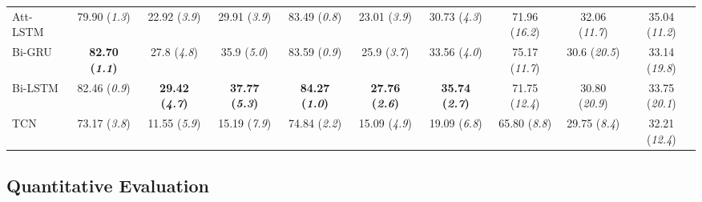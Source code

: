 \documentclass[letterpaper, 10 pt, conference]{ieeeconf}
\begin{document}
\begin{table*}[]
{\begin{tabular}{|l|ccc|ccc|ccc|}
Att-LSTM
& 79.90 (\textit{\scriptsize\scriptsize 1.3})
& 22.92 (\textit{\scriptsize\scriptsize 3.9}) 
& 29.91 (\textit{\scriptsize\scriptsize 3.9})
& 83.49 (\textit{\scriptsize\scriptsize 0.8}) 
& 23.01 (\textit{\scriptsize\scriptsize 3.9}) 
& 30.73 (\textit{\scriptsize\scriptsize 4.3})
& 71.96 (\textit{\scriptsize\scriptsize 16.2}) 
& 32.06 (\textit{\scriptsize\scriptsize 11.7}) 
& 35.04 (\textit{\scriptsize\scriptsize 11.2}) \\

Bi-GRU
& \textbf{82.70 (\textit{\scriptsize\scriptsize 1.1})}
& 27.8 (\textit{\scriptsize\scriptsize 4.8})
& 35.9 (\textit{\scriptsize\scriptsize 5.0})
& 83.59 (\textit{\scriptsize\scriptsize 0.9}) 
& 25.9 (\textit{\scriptsize\scriptsize 3.7}) 
& 33.56 (\textit{\scriptsize\scriptsize 4.0})
& 75.17 (\textit{\scriptsize\scriptsize 11.7}) 
& 30.6 (\textit{\scriptsize\scriptsize 20.5}) 
& 33.14 (\textit{\scriptsize\scriptsize 19.8})
 \\

Bi-LSTM \cite{Zou2019DeepBiLSTMRecognition}
& 82.46 (\textit{\scriptsize\scriptsize 0.9}) 
& \textbf{29.42 (\textit{\scriptsize\scriptsize 4.7})} 
& \textbf{37.77 (\textit{\scriptsize\scriptsize 5.3})}
& \textbf{84.27 (\textit{\scriptsize\scriptsize 1.0})} 
& \textbf{27.76 (\textit{\scriptsize\scriptsize 2.6})} 
& \textbf{35.74 (\textit{\scriptsize\scriptsize 2.7})}
& 71.75 (\textit{\scriptsize\scriptsize 12.4})
& 30.80 (\textit{\scriptsize\scriptsize 20.9}) 
& 33.75 (\textit{\scriptsize\scriptsize 20.1}) \\


TCN \cite {Lea2017TemporalDetection}
& 73.17 (\textit{\scriptsize\scriptsize 3.8}) 
& 11.55 (\textit{\scriptsize\scriptsize 5.9})
& 15.19 (\textit{\scriptsize\scriptsize 7.9})
& 74.84 (\textit{\scriptsize\scriptsize 2.2}) 
& 15.09 (\textit{\scriptsize\scriptsize 4.9}) 
& 19.09 (\textit{\scriptsize\scriptsize 6.8})
& 65.80 (\textit{\scriptsize\scriptsize 8.8})
& 29.75 (\textit{\scriptsize\scriptsize 8.4})
& 32.21 (\textit{\scriptsize\scriptsize 12.4})\\
\end{tabular}}
\label{EvalDataset15Class}
\end{table*}

\subsection{Quantitative Evaluation}\label{QauntEval}
\end{document}
